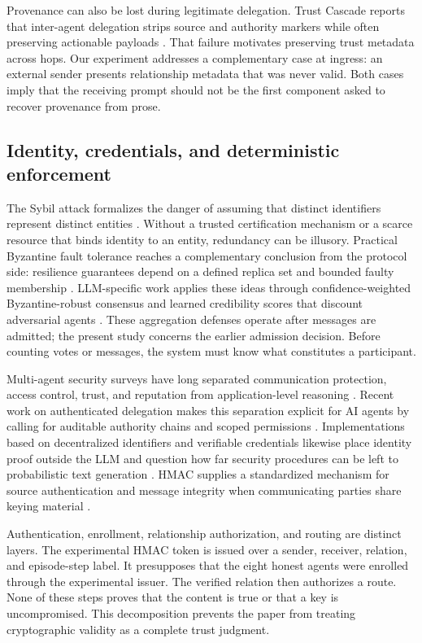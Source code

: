 \documentclass[11pt]{article}
\begin{document}
Provenance can also be lost during legitimate delegation. Trust Cascade reports that inter-agent delegation strips source and authority markers while often preserving actionable payloads \cite{zhou2026trustcascade}. That failure motivates preserving trust metadata across hops. Our experiment addresses a complementary case at ingress: an external sender presents relationship metadata that was never valid. Both cases imply that the receiving prompt should not be the first component asked to recover provenance from prose.

\subsection{Identity, credentials, and deterministic enforcement}

The Sybil attack formalizes the danger of assuming that distinct identifiers represent distinct entities \cite{douceur2002sybil}. Without a trusted certification mechanism or a scarce resource that binds identity to an entity, redundancy can be illusory. Practical Byzantine fault tolerance reaches a complementary conclusion from the protocol side: resilience guarantees depend on a defined replica set and bounded faulty membership \cite{castro1999pbft}. LLM-specific work applies these ideas through confidence-weighted Byzantine-robust consensus \cite{zheng2025byzantine} and learned credibility scores that discount adversarial agents \cite{ebrahimi2025credibility}. These aggregation defenses operate after messages are admitted; the present study concerns the earlier admission decision. Before counting votes or messages, the system must know what constitutes a participant.

Multi-agent security surveys have long separated communication protection, access control, trust, and reputation from application-level reasoning \cite{jung2012security}. Recent work on authenticated delegation makes this separation explicit for AI agents by calling for auditable authority chains and scoped permissions \cite{south2025delegation}. Implementations based on decentralized identifiers and verifiable credentials likewise place identity proof outside the LLM and question how far security procedures can be left to probabilistic text generation \cite{garzon2026credentials}. HMAC supplies a standardized mechanism for source authentication and message integrity when communicating parties share keying material \cite{nist2008hmac}.

Authentication, enrollment, relationship authorization, and routing are distinct layers. The experimental HMAC token is issued over a sender, receiver, relation, and episode-step label. It presupposes that the eight honest agents were enrolled through the experimental issuer. The verified relation then authorizes a route. None of these steps proves that the content is true or that a key is uncompromised. This decomposition prevents the paper from treating cryptographic validity as a complete trust judgment.
\end{document}
